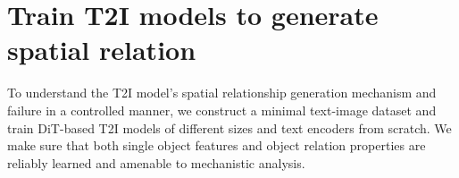 \documentclass[10pt,twocolumn,letterpaper]{article}
\begin{document}


\section{Train T2I models to generate spatial relation}





To understand the T2I model's spatial relationship generation mechanism and failure in a controlled manner, we construct a minimal text-image dataset and train DiT-based T2I models of different sizes and text encoders from scratch. We make sure that both single object features and object relation properties are reliably learned and amenable to mechanistic analysis. 
\end{document}
